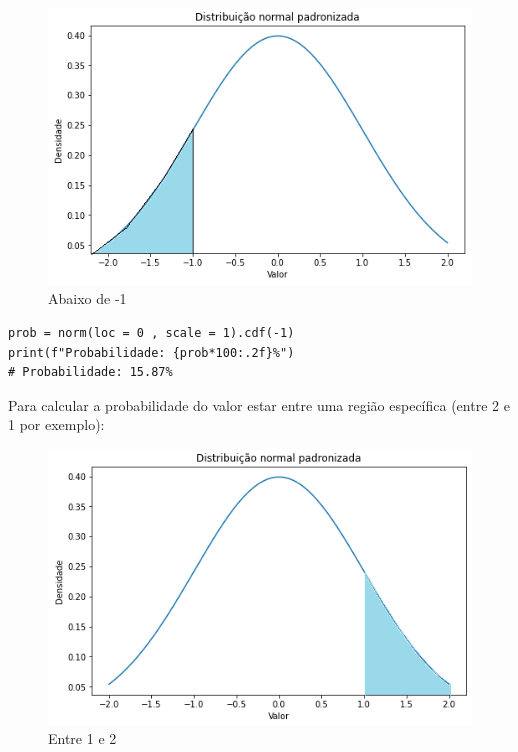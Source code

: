 \begin{figure}[H]
	\centering
	\includegraphics[width=1\textwidth]{./Imagens/Distribuição Normal/GA5.png} 
	\caption{Abaixo de -1}
	\label{fig:GA5}
\end{figure}

\begin{verbatim}
prob = norm(loc = 0 , scale = 1).cdf(-1)
print(f"Probabilidade: {prob*100:.2f}%")
# Probabilidade: 15.87%
\end{verbatim}

Para calcular a probabilidade do valor estar entre uma região específica (entre 2 e 1 por exemplo):

\begin{figure}[H]
	\centering
	\includegraphics[width=1\textwidth]{./Imagens/Distribuição Normal/GA6.png} 
	\caption{Entre 1 e 2}
	\label{fig:GA6}
\end{figure}

